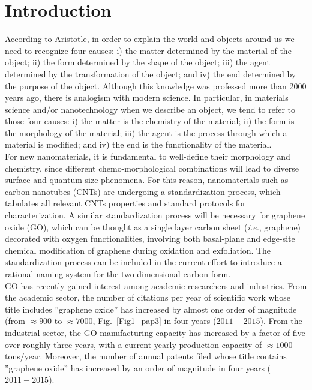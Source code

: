 \justifying
\section{Introduction}
According to Aristotle, in order to explain the world and objects around us we need to recognize four causes: i) the matter determined by the material of the object; ii) the form determined by the shape of the object; iii) the agent determined by the transformation of the object; and iv) the end determined by the purpose of the object.\cite{ARI} Although this knowledge was professed more than 2000 years ago, there is analogism with modern science. In particular, in materials science and/or nanotechnology when we describe an object, we tend to refer to those four causes: i) the matter is the chemistry of the material; ii) the form is the morphology of the material; iii) the agent is the process through which a material is modified; and iv) the end is the functionality of the material.\\
For new nanomaterials, it is fundamental to well-define their morphology and chemistry, since different chemo-morphological combinations will lead to diverse surface and quantum size phenomena. For this reason, nanomaterials such as carbon nanotubes (CNTs) are undergoing a standardization process, which tabulates all relevant CNTs properties and standard protocols for characterization.\cite{IEC} A similar standardization process will be necessary for graphene oxide (GO), which can be thought as a single layer carbon sheet (\textit{i.e.}, graphene) decorated with oxygen functionalities, involving both basal-plane and edge-site chemical modification of graphene during oxidation and exfoliation. The standardization process can be included in the current effort to introduce a rational naming system for the two-dimensional carbon form.\cite{bianco2013all}\\
GO has recently gained interest among academic researchers and industries. From the academic sector, the number of citations per year of scientific work whose title includes ''graphene oxide'' has increased by almost one order of magnitude (from $\approx900$ to $\approx7000$, Fig.~\ref{Fig1_pap3} in four years ($2011-2015$)\cite{WEB}. From the industrial sector, the GO manufacturing capacity has increased by a factor of five over roughly three years, with a current yearly production capacity of $\approx1000$ tons/year.\cite{zurutuza2014challenges,peplow2015graphene} Moreover, the number of annual patents filed whose title contains ''graphene oxide'' has increased by an order of magnitude in four years ($2011-2015$).

